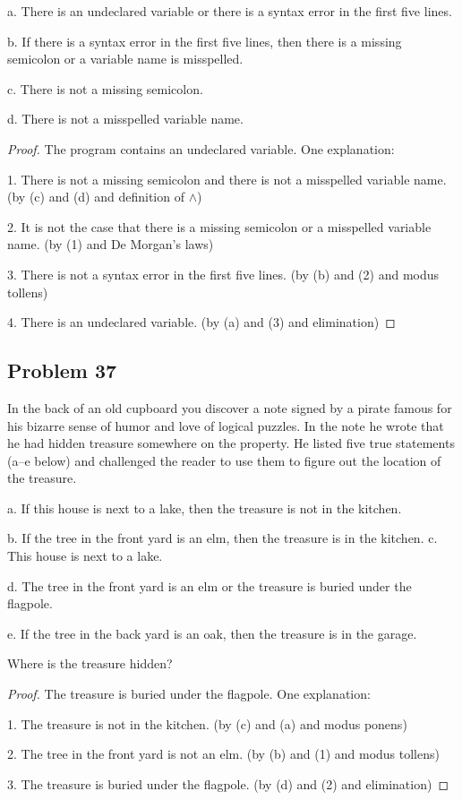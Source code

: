 \documentclass[14pt]{extarticle}
\begin{document}
a. There is an undeclared variable or there is a syntax error in the first five
lines.

b. If there is a syntax error in the first five lines, then there is a missing
semicolon or a variable name is misspelled.

c. There is not a missing semicolon.

d. There is not a misspelled variable name.

\begin{proof}
The program contains an undeclared variable. One explanation:

1. There is not a missing semicolon and there is not a
misspelled variable name. (by (c) and (d) and definition of $\wedge$)

2. It is not the case that there is a missing semicolon or a misspelled variable
name. (by (1) and De Morgan’s laws)

3. There is not a syntax error in the first five lines. (by (b) and (2) and
modus tollens)

4. There is an undeclared variable. (by (a) and (3) and elimination)
\end{proof}

\subsection{Problem 37}
In the back of an old cupboard you discover a note signed by a pirate famous for
his bizarre sense of humor and love of logical puzzles. In the note he wrote
that he had hidden treasure somewhere on the property. He listed five true
statements (a–e
below) and challenged the reader to use them to figure out the location of the
treasure.

a. If this house is next to a lake, then the treasure is not in the kitchen.

b. If the tree in the front yard is an elm, then the treasure is in the kitchen.
c. This house is next to a lake. 

d. The tree in the front yard is an elm or the treasure is buried under the
flagpole.

e. If the tree in the back yard is an oak, then the treasure is in the garage.

Where is the treasure hidden?

\begin{proof}
The treasure is buried under the flagpole. One explanation:

1. The treasure is not in the kitchen. (by (c) and (a) and
modus ponens)

2. The tree in the front yard is not an elm. (by (b) and
(1) and modus tollens)

3. The treasure is buried under the flagpole. (by (d) and (2) and elimination)
\end{proof}
\end{document}
